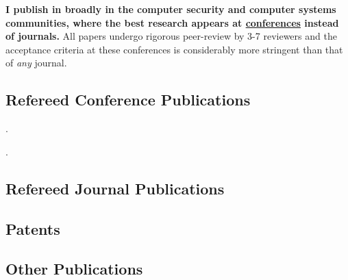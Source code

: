 \textbf{I publish in broadly in the computer security and computer systems communities, where the best research appears at \underline{conferences} instead of journals.}  All papers undergo rigorous peer-review by 3-7 reviewers and the acceptance criteria at these conferences is considerably more stringent than that of \textit{any} journal.
\subsection[Refereed Conference Publications]{Refereed Conference Publications}.
\begin{enumerate}[{[}1{]},parsep=4pt]	
	\item {}.
\end{enumerate}
\subsection{Refereed Journal Publications}

\subsection{Patents}

\subsection{Other Publications}

